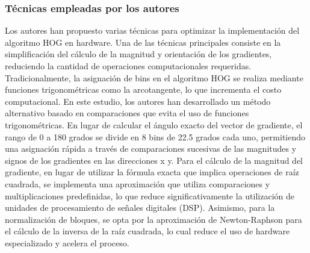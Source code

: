 \subsubsection{Técnicas empleadas por los autores}
Los autores han propuesto varias técnicas para optimizar la implementación del algoritmo HOG en hardware. Una de las técnicas principales consiste en la simplificación del cálculo de la magnitud y orientación de los gradientes, reduciendo la cantidad de operaciones computacionales requeridas. Tradicionalmente, la asignación de bins en el algoritmo HOG se realiza mediante funciones trigonométricas como la arcotangente, lo que incrementa el costo computacional. En este estudio, los autores han desarrollado un método alternativo basado en comparaciones que evita el uso de funciones trigonométricas. En lugar de calcular el ángulo exacto del vector de gradiente, el rango de 0 a 180 grados se divide en 8 bins de 22.5 grados cada uno, permitiendo una asignación rápida a través de comparaciones sucesivas de las magnitudes y signos de los gradientes en las direcciones x y. Para el cálculo de la magnitud del gradiente, en lugar de utilizar la fórmula exacta que implica operaciones de raíz cuadrada, se implementa una aproximación que utiliza comparaciones y multiplicaciones predefinidas, lo que reduce significativamente la utilización de unidades de procesamiento de señales digitales (DSP). Asimismo, para la normalización de bloques, se opta por la aproximación de Newton-Raphson para el cálculo de la inversa de la raíz cuadrada, lo cual reduce el uso de hardware especializado y acelera el proceso.

